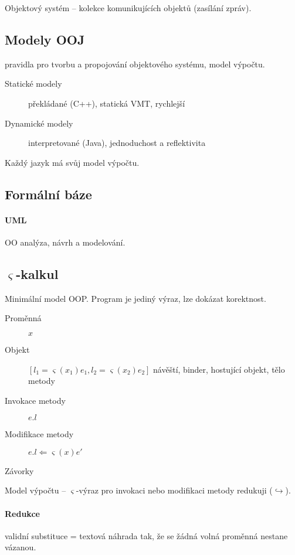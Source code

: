 \documentclass[a4wide]{report}
\begin{document}
Objektový systém -- kolekce komunikujících objektů (zasílání zpráv).

\subsection{Modely OOJ}
pravidla pro tvorbu a propojování objektového systému, model výpočtu.

\begin{description}
	\item[Statické modely] překládané (C++), statická VMT, rychlejší
	\item[Dynamické modely] interpretované (Java), jednoduchost a reflektivita
\end{description}

Každý jazyk má svůj model výpočtu.

\subsection{Formální báze}

\paragraph{UML}
OO analýza, návrh a modelování.

\subsection{$\varsigma$-kalkul}
Minimální model OOP. Program je jediný výraz, lze dokázat korektnost.
\begin{description}
	\item[Proměnná] $x$
	\item[Objekt] $[l_1 = \varsigma(x_1)e_1, l_2 = \varsigma(x_2)e_2]$ návěští, binder, hostující objekt, tělo metody
	\item[Invokace metody] $e.l$
	\item[Modifikace metody] $e.l \Leftarrow \varsigma(x)e'$
	\item[Závorky]
\end{description}

Model výpočtu -- $\varsigma$-výraz pro invokaci nebo modifikaci metody redukuji ($\hookrightarrow$).

\paragraph{Redukce}
validní substituce = textová náhrada tak, že se žádná volná proměnná nestane vázanou.
\end{document}
